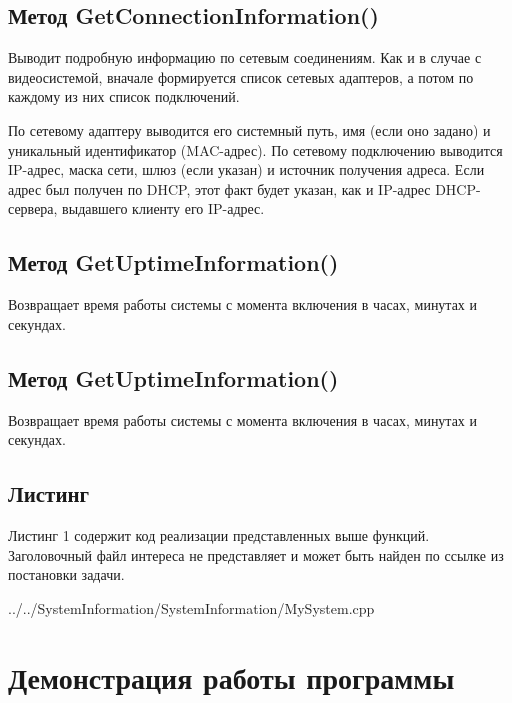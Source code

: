 \documentclass[a4paper, 12pt]{report}		%
\begin{document}
\section*{Метод GetConnectionInformation()}
Выводит подробную информацию по сетевым соединениям. Как и в случае с видеосистемой, вначале формируется список сетевых адаптеров, а потом по каждому из них список подключений.
\vspace{1em}

По сетевому адаптеру выводится его системный путь, имя (если оно задано) и уникальный идентификатор (MAC-адрес). По сетевому подключению выводится IP-адрес, маска сети, шлюз (если указан) и источник получения адреса. Если адрес был получен по DHCP, этот факт будет указан, как и IP-адрес DHCP-сервера, выдавшего клиенту его IP-адрес.

\section*{Метод GetUptimeInformation()}
Возвращает время работы системы с момента включения в часах, минутах и секундах.

\section*{Метод GetUptimeInformation()}
Возвращает время работы системы с момента включения в часах, минутах и секундах.

\section*{Листинг}
Листинг 1 содержит код реализации представленных выше функций. Заголовочный файл интереса не представляет и может быть найден по ссылке из постановки задачи.


{../../SystemInformation/SystemInformation/MySystem.cpp}

\chapter*{Демонстрация работы программы}
\end{document}

